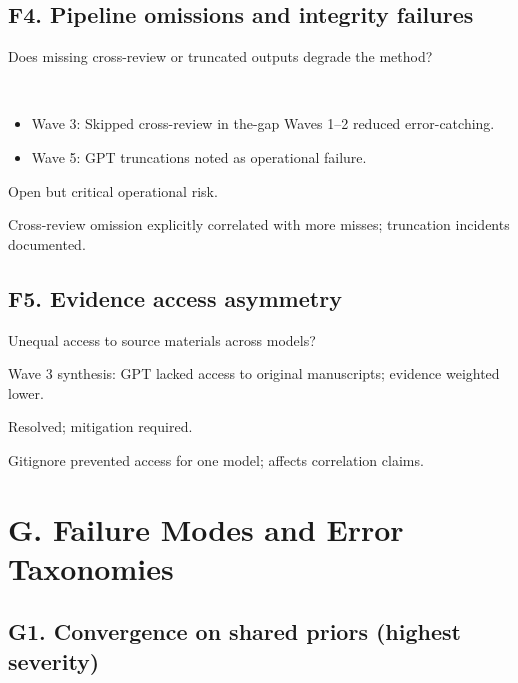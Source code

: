 \documentclass[11pt,letterpaper]{article}
\begin{document}
\subsection{F4. Pipeline omissions and integrity failures}

\begin{reflist}
\item[Dispute:] Does missing cross-review or truncated outputs degrade the method?
\item[Positions:]~
  \begin{itemize}[nosep]
    \item Wave 3: Skipped cross-review in the-gap Waves 1--2 reduced error-catching.
    \item Wave 5: GPT truncations noted as operational failure.
  \end{itemize}
\item[Status:] Open but critical operational risk.
\item[Evidence:] Cross-review omission explicitly correlated with more misses; truncation incidents documented.
\end{reflist}

\subsection{F5. Evidence access asymmetry}

\begin{reflist}
\item[Dispute:] Unequal access to source materials across models?
\item[Positions:] Wave 3 synthesis: GPT lacked access to original manuscripts; evidence weighted lower.
\item[Status:] Resolved; mitigation required.
\item[Evidence:] Gitignore prevented access for one model; affects correlation claims.
\end{reflist}

\section{G. Failure Modes and Error Taxonomies}

\subsection{G1. Convergence on shared priors (highest severity)}
\end{document}
